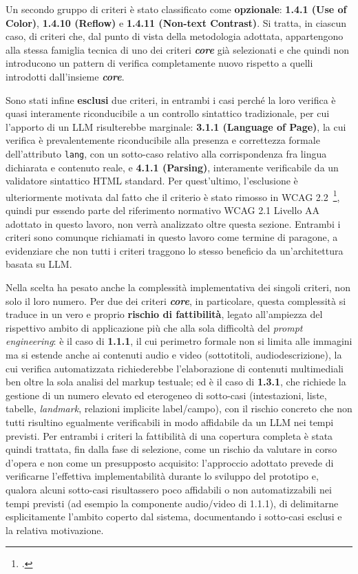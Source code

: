 Un secondo gruppo di criteri è stato classificato come \textbf{opzionale}: \textbf{1.4.1 (Use of Color)}, \textbf{1.4.10 (Reflow)} e \textbf{1.4.11 (Non-text Contrast)}. Si tratta, in ciascun caso, di criteri che, dal punto di vista della metodologia adottata, appartengono alla stessa famiglia tecnica di uno dei criteri \textbf{\emph{core}} già selezionati e che quindi non introducono un pattern di verifica completamente nuovo rispetto a quelli introdotti dall'insieme \textbf{\emph{core}}.

Sono stati infine \textbf{esclusi} due criteri, in entrambi i casi perché la loro verifica è quasi interamente riconducibile a un controllo sintattico tradizionale, per cui l'apporto di un LLM risulterebbe marginale: \textbf{3.1.1 (Language of Page)}, la cui verifica è prevalentemente riconducibile alla presenza e correttezza formale dell'attributo \texttt{lang}, con un sotto-caso relativo alla corrispondenza fra lingua dichiarata e contenuto reale, e \textbf{4.1.1 (Parsing)}, interamente verificabile da un validatore sintattico HTML standard. Per quest'ultimo, l'esclusione è ulteriormente motivata dal fatto che il criterio è stato rimosso in WCAG 2.2~\footcite{w3c:wcag22-changes}, quindi pur essendo parte del riferimento normativo WCAG 2.1 Livello AA adottato in questo lavoro, non verrà analizzato oltre questa sezione. Entrambi i criteri sono comunque richiamati in questo lavoro come termine di paragone, a evidenziare che non tutti i criteri traggono lo stesso beneficio da un'architettura basata su LLM.


Nella scelta ha pesato anche la complessità implementativa dei singoli criteri, non solo il loro numero. Per due dei criteri \textbf{\emph{core}}, in particolare, questa complessità si traduce in un vero e proprio \textbf{rischio di fattibilità}, legato all'ampiezza del rispettivo ambito di applicazione più che alla sola difficoltà del \emph{prompt engineering}: è il caso di \textbf{1.1.1}, il cui perimetro formale non si limita alle immagini ma si estende anche ai contenuti audio e video (sottotitoli, audiodescrizione), la cui verifica automatizzata richiederebbe l'elaborazione di contenuti multimediali ben oltre la sola analisi del markup testuale; ed è il caso di \textbf{1.3.1}, che richiede la gestione di un numero elevato ed eterogeneo di sotto-casi (intestazioni, liste, tabelle, \emph{landmark}, relazioni implicite label/campo), con il rischio concreto che non tutti risultino egualmente verificabili in modo affidabile da un LLM nei tempi previsti. Per entrambi i criteri la fattibilità di una copertura completa è stata quindi trattata, fin dalla fase di selezione, come un rischio da valutare in corso d'opera e non come un presupposto acquisito: l'approccio adottato prevede di verificarne l'effettiva implementabilità durante lo sviluppo del prototipo e, qualora alcuni sotto-casi risultassero poco affidabili o non automatizzabili nei tempi previsti (ad esempio la componente audio/video di 1.1.1), di delimitarne esplicitamente l'ambito coperto dal sistema, documentando i sotto-casi esclusi e la relativa motivazione.
 
